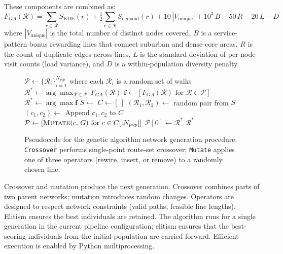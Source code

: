 \documentclass[sigconf,nonacm]{acmart}
\begin{document}
These components are combined as:
\[
  F_{GA}(\mathcal{R}) = \sum_{r \in \mathcal{R}} S_{\mathrm{KDE}}(r)
    + \tfrac{1}{2}\sum_{r \in \mathcal{R}} S_{\mathrm{demand}}(r)
    + 10\,|V_{\mathrm{unique}}|
    + 10^3\,B
    - 50\,R
    - 20\,L
    - D
\]
where $|V_{\mathrm{unique}}|$ is the total number of distinct nodes covered, $B$ is a service-pattern bonus rewarding lines that connect suburban and dense-core areas, $R$ is the count of duplicate edges across lines, $L$ is the standard deviation of per-node visit counts (load variance), and $D$ is a within-population diversity penalty.

\begin{figure}[h]
\centering
\begin{minipage}{1\linewidth}
\begin{algorithmic}
    \State $\mathcal{P} \gets \{\mathcal{R}_i\}_{i=1}^{N_{pop}}$ where each $\mathcal{R}_i$ is a random set of walks
    \State $\mathcal{R}^* \gets \arg\max_{\mathcal{R} \in \mathcal{P}}\, F_{GA}(\mathcal{R})$
        \State $\mathbf{f} \gets [F_{GA}(\mathcal{R}) \text{ for } \mathcal{R} \in \mathcal{P}]$
            \State $\mathcal{R}^* \gets \arg\max \mathbf{f}$
        \EndIf
        \State $S \gets $  
        \State $C \gets [\ ]$
            \State $(\mathcal{R}_1, \mathcal{R}_2) \gets$ random pair from $S$
            \State $(c_1, c_2) \gets$ 
            \State Append $c_1, c_2$ to $C$
        \EndWhile
        \State $\mathcal{P} \gets [\text{\Call{Mutate}{$c$, $G$}} \text{ for } c \in C[{:}N_{pop}]]$
        \State $\mathcal{P}[0] \gets \mathcal{R}^*$ 
    \EndFor
    \State \Return $\mathcal{R}^*$
\EndFunction
\end{algorithmic}
\caption{Pseudocode for the genetic algorithm network generation procedure. \texttt{Crossover} performs single-point route-set crossover; \texttt{Mutate} applies one of three operators (rewire, insert, or remove) to a randomly chosen line.}
\label{fig:ga_pseudocode}
\end{minipage}
\end{figure}

Crossover and mutation produce the next generation. Crossover combines parts of two parent networks; mutation introduces random changes. Operators are designed to respect network constraints (valid paths, feasible line lengths). Elitism ensures the best individuals are retained. The algorithm runs for a single generation in the current pipeline configuration; elitism ensures that the best-scoring individuals from the initial population are carried forward. Efficient execution is enabled by Python multiprocessing.
\end{document}
